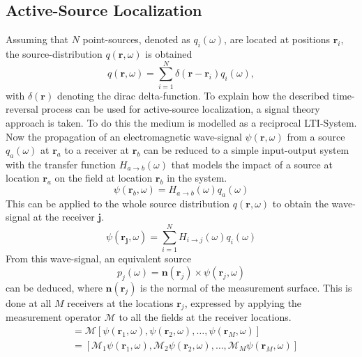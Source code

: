 \subsection{Active-Source Localization}
Assuming that \(N\) point-sources, denoted as \(q_i(\omega)\), are located at positions \(\bm{r}_i\), the source-distribution \(q(\bm{r}, \omega)\) is obtained
\begin{equation}
    q(\bm{r}, \omega) = \sum_{i=1}^{N} \delta(\bm{r} - \bm{r}_i) q_i(\omega),
\end{equation}
with \(\delta(\bm{r}) \) denoting the dirac delta-function.
To explain how the described time-reversal process can be used for active-source localization, a signal theory approach is taken.
To do this the medium is modelled as a reciprocal LTI-System.
Now the propagation of an electromagnetic wave-signal \(\psi(\bm{r}, \omega )\) from a source \(q_a(\omega )\) at \(\bm{r}_a\) to a receiver at \(\bm{r}_b\) can be reduced to a simple input-output system with the transfer function \(H_{a\rightarrow b}(\omega)\) that models the impact of a source at location \(\bm{r}_a\) on the field at location \(\bm{r}_b\) in the system.
\begin{equation}
    \psi(\bm{r}_b, \omega) = H_{a\rightarrow b}(\omega) q_a(\omega)
\end{equation}
This can be applied to the whole source distribution \(q(\bm{r}, \omega)\) to obtain the wave-signal at the receiver \(\bm{j}\).
\begin{equation}
    \psi(\bm{r_j}, \omega) = \sum_{i=1}^{N} H_{i\rightarrow j}(\omega) q_i(\omega)
\end{equation}
From this wave-signal, an equivalent source 
\begin{equation}
    p_j(\omega) = \bm{n}(\bm{r}_j) \times \psi(\bm{r}_j, \omega)
\end{equation}
can be deduced, where \(\bm{n}(\bm{r}_j)\) is the normal of the measurement surface. 
This is done at all \(M\) receivers at the locations \(\bm{r}_j\), expressed by applying the measurement operator \(\mathcal{M}\) to all the fields at the receiver locations.  
\begin{align}
    [p_1(\omega), p_2(\omega), \ldots, p_M(\omega)] &= \mathcal{M} [\psi(\bm{r}_1, \omega), \psi(\bm{r}_2, \omega), \ldots, \psi(\bm{r}_M, \omega)] \\
                                                    &= [\mathcal{M}_1 \psi(\bm{r}_1, \omega), \mathcal{M}_2 \psi(\bm{r}_2, \omega), \ldots, \mathcal{M}_M \psi(\bm{r}_M, \omega)]
\end{align}
